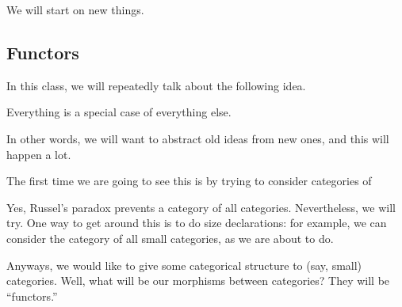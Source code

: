 
We will start on new things.

\subsection{Functors}
In this class, we will repeatedly talk about the following idea.
\begin{idea}
	Everything is a special case of everything else.
\end{idea}
In other words, we will want to abstract old ideas from new ones, and this will happen a lot.

The first time we are going to see this is by trying to consider categories of 
\begin{remark}
	Yes, Russel's paradox prevents a category of all categories. Nevertheless, we will try. One way to get around this is to do size declarations: for example, we can consider the category of all small categories, as we are about to do.
\end{remark}
Anyways, we would like to give some categorical structure to (say, small) categories. Well, what will be our morphisms between categories? They will be ``functors.''


